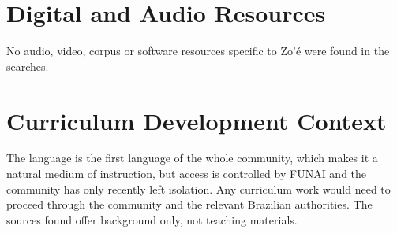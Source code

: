\documentclass[12pt]{article}
\begin{document}
\section{Digital and Audio Resources}
No audio, video, corpus or software resources specific to Zo'\'e were found in the searches.

\section{Curriculum Development Context}
The language is the first language of the whole community, which makes it a natural medium of instruction, but access is controlled by FUNAI and the community has only recently left isolation. Any curriculum work would need to proceed through the community and the relevant Brazilian authorities. The sources found offer background only, not teaching materials.
\end{document}
